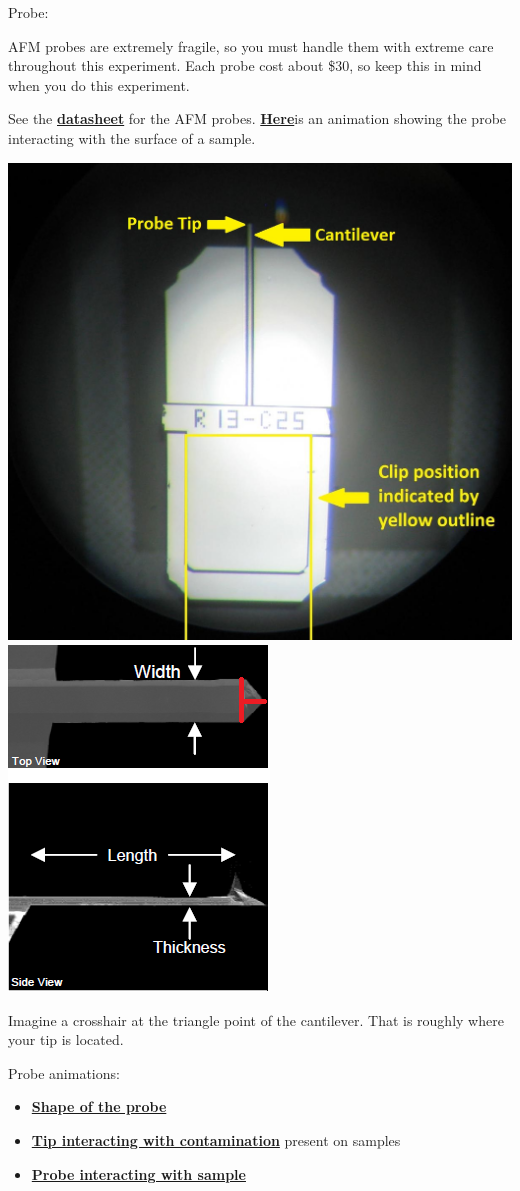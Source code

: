 \documentclass{../lab}
\begin{document}
Probe:

AFM probes are extremely fragile, so you must handle them with extreme care throughout this experiment.  Each probe cost about \$30, so keep this in mind when you do this experiment.

See the \href{http://experimentation.berkeley.edu/sites/default/files/AFMImages/ACLA\_4\_datasheet.pdf}{\textbf{datasheet}} for the AFM probes. \textbf{ }\href{http://dev-physicsadv.pantheon.berkeley.edu/sites/default/files/AFMImages/1.1.\%20Generating\%20an\%20image.flv\_converted.mp4}{\textbf{\textbf{Here}}}is an animation showing the probe interacting with the surface of a sample.

\noindent
\href{http://dev-physicsadv.pantheon.berkeley.edu/sites/default/files/AFMImages/AFMprobe.JPG}{\includegraphics[width=0.33\linewidth,keepaspectratio]{images/AFMprobe.JPG}}
\href{http://dev-physicsadv.pantheon.berkeley.edu/sites/default/files/AFMImages/26.png}{\includegraphics[width=0.33\linewidth,keepaspectratio]{images/26.png}}

Imagine a crosshair at the triangle point of the cantilever. That is roughly where your tip is located.

Probe animations:

\begin{itemize}
    \item \href{http://experimentationlab.berkeley.edu/sites/default/files/AFMImages/5.2.\%20Probe\%20Shape\%20-\%20Hole.flv\_converted.mp4}{\textbf{Shape of the probe}}

    \item \href{http://experimentationlab.berkeley.edu/sites/default/files/AFMImages/5.1\%20Contamination.flv\_converted.mp4}{\textbf{Tip interacting with contamination}} present on samples

    \item \href{http://experimentationlab.berkeley.edu/sites/default/files/AFMImages/5.3.\%20Probe\%20Sample\%20Bump.flv\_converted.mp4}{\textbf{Probe interacting with sample}}

\end{itemize}
\end{document}

